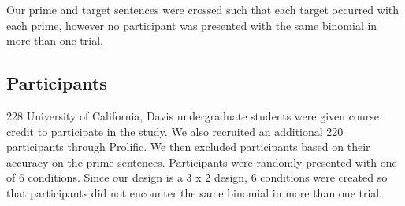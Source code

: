 \documentclass[
  12pt,
]{scrartcl}
\begin{document}
\begin{table}

\caption{\label{tbl-conditionslist}A table of our conditions.}


\end{table}%

Our prime and target sentences were crossed such that each target
occurred with each prime, however no participant was presented with the
same binomial in more than one trial.

\subsection{Participants}\label{participants}

228 University of California, Davis undergraduate students were given
course credit to participate in the study. We also recruited an
additional 220 participants through Prolific. We then excluded
participants based on their accuracy on the prime sentences.
Participants were randomly presented with one of 6 conditions. Since our
design is a 3 x 2 design, 6 conditions were created so that participants
did not encounter the same binomial in more than one trial.
\end{document}
